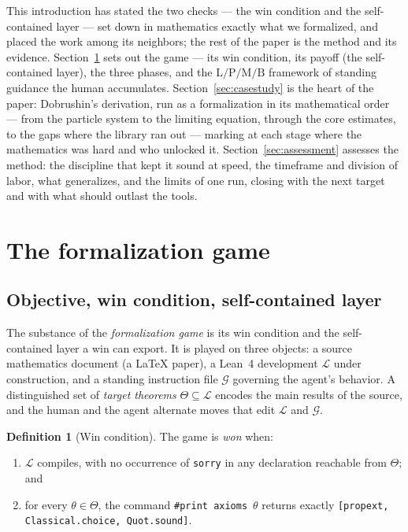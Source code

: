 \documentclass[11pt]{article}
\theoremstyle{plain}
\theoremstyle{definition}
\newtheorem{definition}[theorem]{Definition}
\theoremstyle{remark}
\newcommand{\lean}[1]{\texttt{#1}}
\newcommand{\printaxioms}{\lean{\#print axioms}}
\newcommand{\cleanfootprint}{\lean{[propext, Classical.choice, Quot.sound]}}
\begin{document}
This introduction has stated the two checks --- the win condition and the
self-contained layer --- set down in mathematics
exactly what we formalized, and placed the work among its neighbors; the rest of
the paper is the method and its evidence. Section~\ref{sec:game} sets out the game
--- its win condition, its payoff (the self-contained layer), the three phases, and the
$\mathrm{L}/\mathrm{P}/\mathrm{M}/\mathrm{B}$ framework of standing guidance the
human accumulates. Section~\ref{sec:casestudy}
is the heart of the paper: Dobrushin's derivation, run as a formalization in its
mathematical order --- from the particle system to the limiting equation, through the
core estimates, to the gaps where the library ran out --- marking at each stage where
the mathematics was hard and who unlocked it. Section~\ref{sec:assessment} assesses the
method: the discipline that kept it sound at speed, the timeframe and division of labor,
what generalizes, and the limits of one run, closing with the next target and
with what should outlast the tools.

\section{The formalization game}\label{sec:game}

\subsection{Objective, win condition, self-contained layer}

The substance of the \emph{formalization game} is its win condition and the
self-contained layer a win can export. It is played on three objects: a source mathematics document (a
\LaTeX{} paper), a Lean~4 development $\mathcal{L}$ under construction, and a
standing instruction file $\mathcal{G}$ governing the agent's behavior. A
distinguished set of \emph{target theorems} $\Theta \subseteq \mathcal{L}$ encodes
the main results of the source, and the human and the agent alternate moves that
edit $\mathcal{L}$ and $\mathcal{G}$.

\begin{definition}[Win condition]\label{def:win}
The game is \emph{won} when:
\begin{enumerate}[label=(W\arabic*),leftmargin=3em]
\item $\mathcal{L}$ compiles, with no occurrence of \lean{sorry} in any
declaration reachable from $\Theta$; and
\item for every $\theta \in \Theta$, the command \printaxioms{}~$\theta$
returns exactly \cleanfootprint.
\end{enumerate}
\end{definition}
\end{document}
